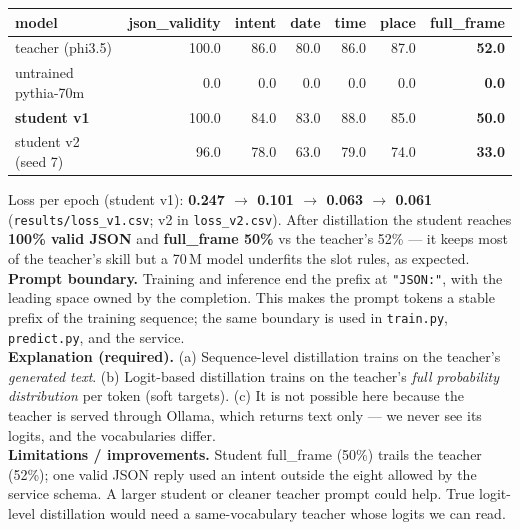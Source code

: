 \documentclass[10pt,a4paper]{article}
\newcommand{\code}[1]{\texttt{\small #1}}
\begin{document}
\begin{center}\small
\begin{tabular}{lrrrrrr}
\toprule
model & json\_validity & intent & date & time & place & full\_frame \\
\midrule
teacher (phi3.5) & 100.0 & 86.0 & 80.0 & 86.0 & 87.0 & \textbf{52.0} \\
untrained pythia-70m & 0.0 & 0.0 & 0.0 & 0.0 & 0.0 & \textbf{0.0} \\
\textbf{student v1} & 100.0 & 84.0 & 83.0 & 88.0 & 85.0 & \textbf{50.0} \\
student v2 (seed 7) & 96.0 & 78.0 & 63.0 & 79.0 & 74.0 & \textbf{33.0} \\
\bottomrule
\end{tabular}
\end{center}

\noindent Loss per epoch (student v1): \textbf{0.247 $\rightarrow$ 0.101 $\rightarrow$ 0.063 $\rightarrow$ 0.061}
(\code{results/loss\_v1.csv}; v2 in \code{loss\_v2.csv}). After distillation the student reaches
\textbf{100\% valid JSON} and \textbf{full\_frame 50\%} vs the teacher's 52\% --- it keeps most of the
teacher's skill but a 70\,M model underfits the slot rules, as expected.\\
\textbf{Prompt boundary.} Training and inference end the prefix at \code{"JSON:"}, with the leading
space owned by the completion. This makes the prompt tokens a stable prefix of the training sequence;
the same boundary is used in \code{train.py}, \code{predict.py}, and the service.\\
\textbf{Explanation (required).} (a) Sequence-level distillation trains on the teacher's \textit{generated
text}. (b) Logit-based distillation trains on the teacher's \textit{full probability distribution} per token
(soft targets). (c) It is not possible here because the teacher is served through Ollama, which returns text
only --- we never see its logits, and the vocabularies differ.\\
\textbf{Limitations / improvements.} Student full\_frame (50\%) trails the teacher (52\%); one valid JSON
reply used an intent outside the eight allowed by the service schema. A larger student or cleaner teacher
prompt could help. True logit-level distillation
would need a same-vocabulary teacher whose logits we can read.
\end{document}
